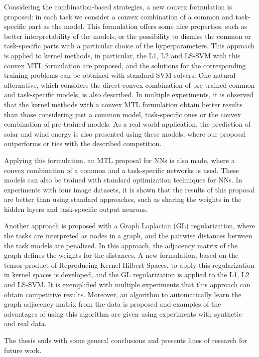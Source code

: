 \documentclass[a4paper, 11pt]{Thesis}  %
\begin{document}
{{Considering the combination-based strategies, a new convex formulation is proposed: in each task we consider a convex combination of a common and task-specific part as the model. This formulation offers some nice properties, such as better interpretability of the models, or the possibility to dismiss the common or task-specific parts with a particular choice of the hyperparameters.
This approach is applied to kernel methods, in particular, the L1, L2 and LS-SVM with this convex MTL formulation are proposed, and the solutions for the corresponding training problems can be obtained with standard SVM solvers.
One natural alternative, which considers the direct convex combination of pre-trained common and task-specific models, is also described.
In multiple experiments, it is observed that the kernel methods with a convex MTL formulation obtain better results than those considering just a common model, task-specific ones or the convex combination of pre-trained models.
As a real world application, the prediction of solar and wind energy is also presented using these models, where our proposal outperforms or ties with the described competition.

%
Applying this formulation, an MTL proposal for NNs is also made, where a convex combination of a common and a task-specific networks is used. These models can also be trained with standard optimization techniques for NNs.
In experiments with four image datasets, it is shown that the results of this proposal are better than using standard approaches, such as sharing the weights in the hidden layers and task-specific output neurons.


Another approach is proposed with a Graph Laplacian (GL) regularization, where the tasks are interpreted as nodes in a graph, and the pairwise distances between the task models are penalized. In this approach, the adjacency matrix of the graph defines the weights for the distances. A new formulation, based on the tensor product of Reproducing Kernel Hilbert Spaces, to apply this regularization in kernel spaces is developed, and the GL regularization is applied to the L1, L2 and LS-SVM. 
It is exemplified with multiple experiments that this approach can obtain competitive results. 
%
Moreover, an algorithm to automatically learn the graph adjacency matrix from the data is proposed and examples of the advantages of using this algorithm are given using experiments with synthetic and real data.

The thesis ends with some general conclusions and presents lines of research for future work. 
%
}

}
\end{document}
